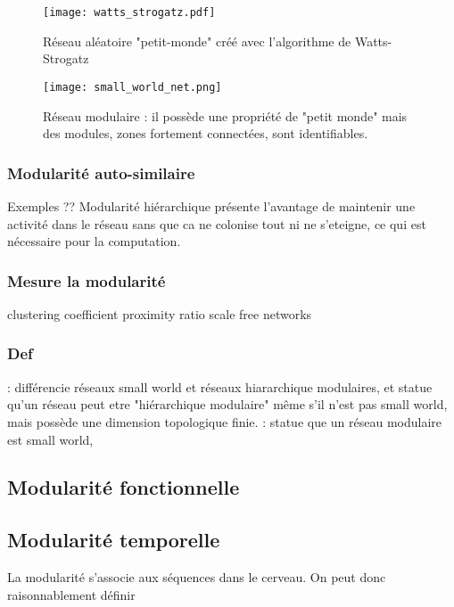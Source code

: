 \begin{figure}
\begin{minipage}{0.5\textwidth}
\texttt{[image: watts\_strogatz.pdf]}
\caption{Réseau aléatoire "petit-monde" créé avec l'algorithme de Watts-Strogatz}
\end{minipage}
\begin{minipage}{0.5\textwidth}
\texttt{[image: small\_world\_net.png]}
\caption{Réseau modulaire : il possède une propriété de "petit monde" mais des modules, zones fortement connectées, sont identifiables.}
\end{minipage}

\end{figure}
\subsubsection{Modularité auto-similaire}

Exemples ?? \cite{Meunier2010ModularAH}
Modularité hiérarchique présente l'avantage de maintenir une activité dans le réseau sans que ca ne colonise tout ni ne s'eteigne, ce qui est nécessaire pour la computation. 


\subsubsection{Mesure la modularité}

clustering coefficient
proximity ratio
scale free networks

\subsubsection{Def}
\cite{Hilgetag2015IsTB} : différencie réseaux small world et réseaux hiararchique modulaires, et statue qu'un réseau peut etre "hiérarchique modulaire" même s'il n'est pas small world, mais possède une dimension topologique finie. 
\cite{Meunier2010ModularAH} : statue que un réseau modulaire est small world,

\subsection{Modularité fonctionnelle}


\subsection{Modularité temporelle}

La modularité s'associe aux séquences dans le cerveau. On peut donc raisonnablement définir 


